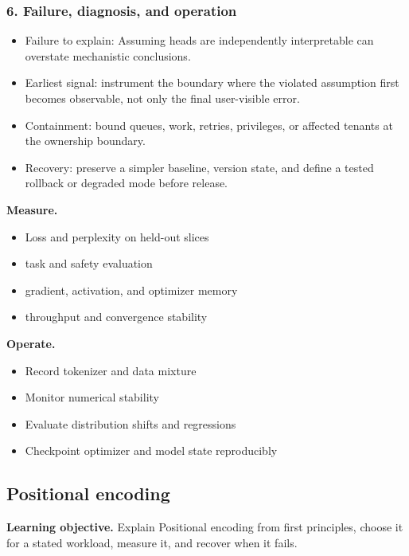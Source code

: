 \subsubsection*{6. Failure, diagnosis, and operation}
\begin{itemize}
\item Failure to explain: Assuming heads are independently interpretable can overstate mechanistic conclusions.
\item Earliest signal: instrument the boundary where the violated assumption first becomes observable, not only the final user-visible error.
\item Containment: bound queues, work, retries, privileges, or affected tenants at the ownership boundary.
\item Recovery: preserve a simpler baseline, version state, and define a tested rollback or degraded mode before release.
\end{itemize}
\textbf{Measure.}\begin{itemize}
\item Loss and perplexity on held-out slices
\item task and safety evaluation
\item gradient, activation, and optimizer memory
\item throughput and convergence stability
\end{itemize}
\textbf{Operate.}\begin{itemize}
\item Record tokenizer and data mixture
\item Monitor numerical stability
\item Evaluate distribution shifts and regressions
\item Checkpoint optimizer and model state reproducibly
\end{itemize}
\subsection{Positional encoding}
\textbf{Learning objective.} Explain Positional encoding from first principles, choose it for a stated workload, measure it, and recover when it fails.
